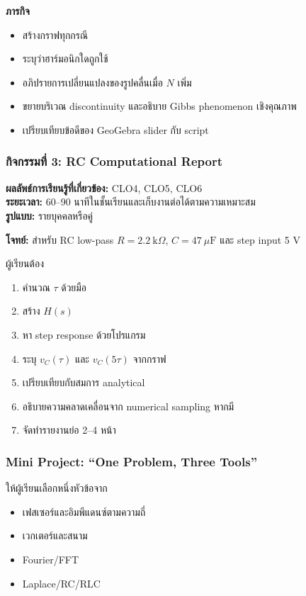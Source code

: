\textbf{ภารกิจ}

\begin{itemize}
    \item สร้างกราฟทุกกรณี
    \item ระบุว่าฮาร์มอนิกใดถูกใช้
    \item อภิปรายการเปลี่ยนแปลงของรูปคลื่นเมื่อ $N$ เพิ่ม
    \item ขยายบริเวณ discontinuity และอธิบาย Gibbs phenomenon เชิงคุณภาพ
    \item เปรียบเทียบข้อดีของ GeoGebra slider กับ script
\end{itemize}

\subsubsection{กิจกรรมที่ 3: RC Computational Report}

\textbf{ผลลัพธ์การเรียนรู้ที่เกี่ยวข้อง:} CLO4, CLO5, CLO6 \\
\textbf{ระยะเวลา:} 60–90 นาทีในชั้นเรียนและเก็บงานต่อได้ตามความเหมาะสม \\
\textbf{รูปแบบ:} รายบุคคลหรือคู่

\textbf{โจทย์:} สำหรับ RC low-pass $R=2.2\ \text{k}\Omega$, $C=47\ \mu\text{F}$ และ step input 5 V

ผู้เรียนต้อง

\begin{enumerate}
    \item คำนวณ $\tau$ ด้วยมือ
    \item สร้าง $H(s)$
    \item หา step response ด้วยโปรแกรม
    \item ระบุ $v_C(\tau)$ และ $v_C(5\tau)$ จากกราฟ
    \item เปรียบเทียบกับสมการ analytical
    \item อธิบายความคลาดเคลื่อนจาก numerical sampling หากมี
    \item จัดทำรายงานย่อ 2–4 หน้า
\end{enumerate}

\subsubsection{Mini Project: “One Problem, Three Tools”}

ให้ผู้เรียนเลือกหนึ่งหัวข้อจาก

\begin{itemize}
    \item เฟสเซอร์และอิมพีแดนซ์ตามความถี่
    \item เวกเตอร์และสนาม
    \item Fourier/FFT
    \item Laplace/RC/RLC
\end{itemize}

